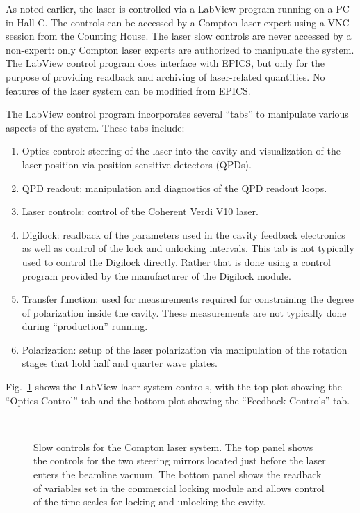 {As noted earlier, the laser is controlled via a LabView program running on a PC in Hall C. The controls
can be accessed by a Compton laser expert using a VNC session from the Counting House.  The laser slow
controls are never accessed by a non-expert: only Compton laser experts are authorized to manipulate the
system. The LabView control program does interface with EPICS, but only for the purpose of providing
readback and archiving of laser-related quantities.  No features of the laser system can be modified
from EPICS.

The LabView control program incorporates several ``tabs'' to manipulate various aspects of the system. These
tabs include:
\begin{enumerate}
 \item{Optics control: steering of the laser into the cavity and visualization of the laser position via
 position sensitive detectors (QPDs).}
 \item{QPD readout: manipulation and diagnostics of the QPD readout loops.}
 \item{Laser controls: control of the Coherent Verdi V10 laser.}
 \item{Digilock: readback of the parameters used in the cavity feedback electronics as well as control
 of the lock and unlocking intervals. This tab is not typically used to control the Digilock directly. Rather
 that is done using a control program provided by the manufacturer of the Digilock module.}
 \item{Transfer function: used for measurements required for constraining the degree of polarization inside the
 cavity. These measurements are not typically done during ``production'' running.}
 \item{Polarization: setup of the laser polarization via manipulation of the rotation stages that hold
 half and quarter wave plates.}
 \end{enumerate}

Fig.~\ref{fig:laser_controls} shows the LabView laser system controls, with the top plot showing the
``Optics Control'' tab and the bottom plot showing the ``Feedback Controls'' tab.


\begin{figure}[htp]
\begin{center}
\\
\caption{Slow controls for the Compton laser system.  The top panel shows the controls for the
two steering mirrors located just before the laser enters the beamline vacuum. The bottom panel
shows the readback of variables set in the commercial locking module and allows control of the time
scales for locking and unlocking the cavity.\label{fig:laser_controls}}
\end{center}
\end{figure}


}
